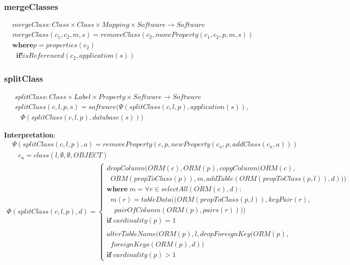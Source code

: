\documentclass[10pt]{article}
\begin{document}
\subsubsection{mergeClasses}
\begin{align}
& mergeClass:  Class \times Class \times Mapping \times Software \rightarrow Software \\
& mergeClass(c_1, c_2, m, s) = removeClass(c_2, moveProperty(c_1, c_2, p, m, s)) \\
& \mathbf{where} p = properties(c_2) \nonumber \\ 
& \;\; \mathbf{if} !isReferenced(c_2, application(s))
\end{align}


\subsubsection{splitClass}
\begin{align}
& splitClass: Class \times Label \times Property \times Software \rightarrow Software \\
& splitClass(c, l, p, s) = software(\Psi(splitClass(c, l, p), application(s)), \nonumber \\
& \;\;\; \Phi(splitClass(c, l, p), database(s)))
\end{align}

\noindent \textbf{Interpretation}:
\begin{align}
& \Psi(splitClass(c, l, p), a) =
removeProperty(c, p, newProperty(c_n, p,  addClass(c_n, a))) \nonumber \\
& \;\;\; c_n = class(l, \emptyset, \emptyset, OBJECT)
\end{align}
\begin{align}
\Phi(splitClass(c, l, p), d) = \begin{cases}
dropColumn(ORM(c), ORM(p), copyColumn(ORM(c), \\  \;\; ORM(propToClass(p)), m, addTable(ORM(propToClass(p, l)), d)))\\
\mathbf{where} \; m = \forall r \in selectAll(ORM(c), d) : \\  \;\; m(r) = tableData((ORM(propToClass(p, l)), keyPair(r), \\  \;\;\;\; pairOfColumn(ORM(p), pairs(r)))) \\ 
  \mathbf{if} \; cardinality(p) = 1   \\\\
alterTableName(ORM(p), l, dropForeignKey(ORM(p), \\ \;\; foreignKeys(ORM(p), d)) \\ 
  \mathbf{if} \; cardinality(p) > 1  
 \end{cases}
\end{align}
\end{document}
